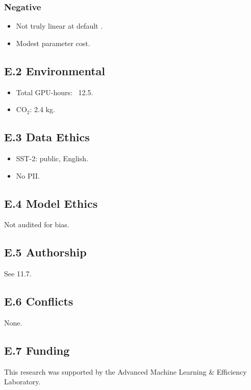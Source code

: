 \subsubsection{Negative}
\begin{itemize}
\item Not truly linear at default  .
\item Modest parameter cost.

\end{itemize}
\subsection{E.2 Environmental}

\begin{itemize}
\item Total GPU-hours: ~12.5.
\item CO$_2$: 2.4 kg.

\end{itemize}
\subsection{E.3 Data Ethics}

\begin{itemize}
\item SST-2: public, English.
\item No PII.

\end{itemize}
\subsection{E.4 Model Ethics}

Not audited for bias.

\subsection{E.5 Authorship}

See  11.7.

\subsection{E.6 Conflicts}

None.

\subsection{E.7 Funding}

This research was supported by the Advanced Machine Learning \& Efficiency Laboratory.

